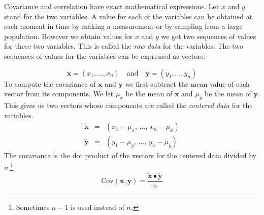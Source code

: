    Covariance and correlation have exact mathematical expressions.  Let $x$ and 
$y$ stand for the two variables.  A value for each of the variables can be 
obtained at each moment in time by making a measurement or by sampling from a 
large population.  However we obtain values for $x$ and $y$ we get two 
sequences of values for these two variables.  This is called the 
\emph{raw data} for the variables.  The two sequences of values for the 
variables can be expressed as vectors:

\begin{equation}
\mathbf{x} = (x_1, \dots, x_n) \quad \mbox{and} \quad 
\mathbf{y} = (y_1, \dots, y_n)
\end{equation}
To compute the covariance of $\mathbf{x}$ and $\mathbf{y}$ we first subtract 
the mean value of each vector from its components.  We let $\mu_x$ be the 
mean of $\mathbf{x}$ and $\mu_y$ be the mean of $\mathbf{y}$.  This gives 
us two vectors whose components are called the \emph{centered data} for the 
variables.
\begin{eqnarray}
\tilde{\mathbf{x}} &=& (x_1 - \mu_x, \, \dots, \, x_n - \mu_x) 
                                                             \nonumber \\[1mm]
\tilde{\mathbf{y}} &=& (y_1 - \mu_y, \, \dots, \, y_n - \mu_y) 
\end{eqnarray}
The covariance is the dot product of the vectors for the centered data divided 
by $n$.\footnote{Sometimes $n-1$ is used instead of $n$.}
\begin{equation}\label{E:covdef}
\mathrm{Cov}(\mathbf{x}, \mathbf{y}) = \frac{\tilde{\mathbf{x}} \bullet 
                                             \tilde{\mathbf{y}}}{n} 
\end{equation}

